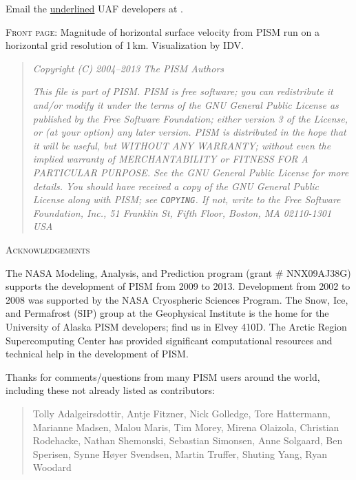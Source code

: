 \documentclass[titlepage,letterpaper,final]{scrartcl}
\begin{document}
\bigskip
\noindent Email the \underline{underlined} UAF developers at \qquad \PISMEMAIL.

\bigskip\bigskip
\noindent \textsc{Front page}:  Magnitude of horizontal surface velocity from PISM run on a horizontal grid resolution of 1\,km.  Visualization by IDV.

\vfill

\newpage
\vspace{0.2in}
\begin{quote}
\textsl{Copyright (C) 2004--2013 The PISM Authors}
\medskip

\noindent \textsl{This file is part of PISM.  PISM is free software; you can redistribute it and/or modify it under the terms of the GNU General Public License as published by the Free Software Foundation; either version 3 of the License, or (at your option) any later version.  PISM is distributed in the hope that it will be useful, but WITHOUT ANY WARRANTY; without even the implied warranty of MERCHANTABILITY or FITNESS FOR A PARTICULAR PURPOSE.  See the GNU General Public License for more details.  You should have received a copy of the GNU General Public License along with PISM; see \emph{\texttt{COPYING}}.  If not, write to the Free Software Foundation, Inc., 51 Franklin St, Fifth Floor, Boston, MA  02110-1301 USA}
\end{quote}
\vspace{0.5in}

\centerline{\textsc{Acknowledgements}}
\bigskip

\small
The NASA Modeling, Analysis, and Prediction program (grant \# NNX09AJ38G) supports the development of PISM from 2009 to 2013.  Development from 2002 to 2008 was supported by the NASA Cryospheric Sciences Program.  The Snow, Ice, and Permafrost (SIP) group at the Geophysical Institute is the home for the University of Alaska PISM developers; find us in Elvey 410D.  The Arctic Region Supercomputing Center has provided significant computational resources and technical help in the development of PISM.

Thanks for comments/questions from many PISM users around the world, including these not already listed as contributors:

\begin{quote}
Tolly Adalgeirsdottir, Antje Fitzner, Nick Golledge, Tore Hattermann, Marianne Madsen, Malou Maris, Tim Morey, Mirena Olaizola, Christian Rodehacke, Nathan Shemonski, Sebastian Simonsen, Anne Solgaard, Ben Sperisen, Synne H\o{}yer Svendsen, Martin Truffer, Shuting Yang, Ryan Woodard
\end{quote}
\end{document}
